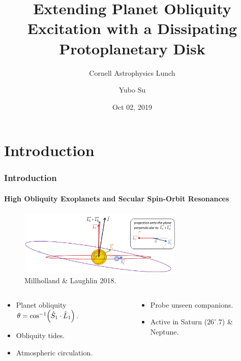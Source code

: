 \documentclass[dvipsnames]{beamer}
\DeclarePairedDelimiter\p{\lparen}{\rparen}
\begin{document}
\title[Disks \& Obliquities]{Extending Planet Obliquity Excitation with a
Dissipating Protoplanetary Disk}
\subtitle{Cornell Astrophysics Lunch}
\author{Yubo Su}
\date{Oct 02, 2019}

\maketitle

\section{Introduction}

\begin{frame}
    \frametitle{Introduction}
    \framesubtitle{High Obliquity Exoplanets and Secular Spin-Orbit Resonances}

    \begin{figure}[t]
        \centering
        \includegraphics[width=0.7\textwidth]{millholland_laughlin.png}
        \caption{Millholland \& Laughlin 2018.}
    \end{figure}
    \begin{columns}
        \begin{column}{0.5\textwidth}
            \begin{itemize}
                \item Planet obliquity $\theta = \cos^{-1}\p*{\hat{S}_1 \cdot
                    \hat{L}_1}$.
                \item Obliquity tides.
                \item Atmospheric circulation.
            \end{itemize}
        \end{column}
        \begin{column}{0.5\textwidth}
            \begin{itemize}
                \item Probe unseen companions.
                \item Active in Saturn ($26^\circ.7$) \& Neptune.
            \end{itemize}
        \end{column}
    \end{columns}
\end{frame}
\end{document}
